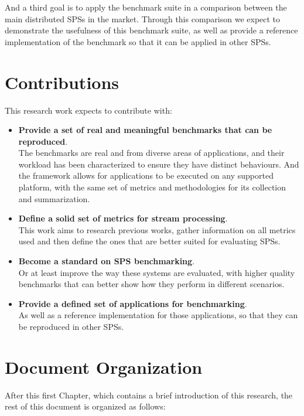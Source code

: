 \documentclass[ppgc,diss,english]{iiufrgs}
\begin{document}
And a third goal is to apply the benchmark suite in a comparison between the main distributed SPSs in the market. Through this comparison we expect to demonstrate the usefulness of this benchmark suite, as well as provide a reference implementation of the benchmark so that it can be applied in other SPSs.

\section{Contributions}

This research work expects to contribute with:

\begin{itemize}
\item \textbf{Provide a set of real and meaningful benchmarks that can be reproduced}.\\
	  The benchmarks are real and from diverse areas of applications, and their workload has been characterized to ensure they have distinct behaviours. And the framework allows for applications to be executed on any supported platform, with the same set of metrics and methodologies for its collection and summarization. 

\item \textbf{Define a solid set of metrics for stream processing}.\\
	  This work aims to research previous works, gather information on all metrics used and then define the ones that are better suited for evaluating SPSs.

\item \textbf{Become a standard on SPS benchmarking}.\\
      Or at least improve the way these systems are evaluated, with higher quality benchmarks that can better show how they perform in different scenarios.
      
\item \textbf{Provide a defined set of applications for benchmarking}.\\
      As well as a reference implementation for those applications, so that they can be reproduced in other SPSs.
      

\end{itemize}


\section{Document Organization}

After this first Chapter, which contains a brief introduction of this research, the rest of this document is organized as follows:
\end{document}
